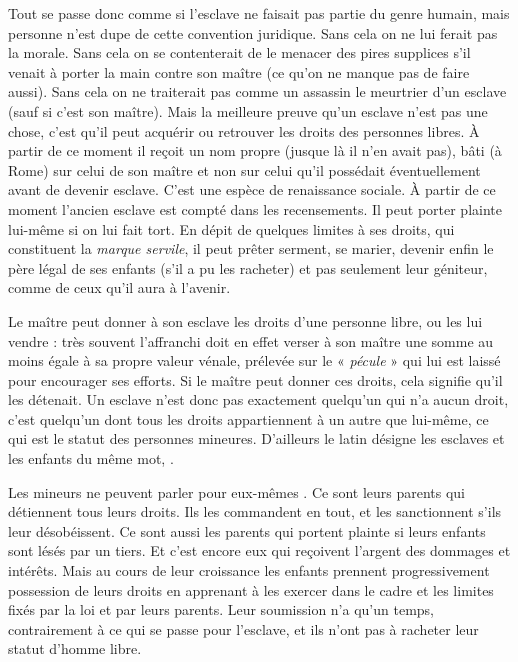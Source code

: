 Tout se passe donc comme si l'esclave ne faisait pas partie du genre
humain, mais personne n'est dupe de cette convention juridique. Sans
cela on ne lui ferait pas la morale. Sans cela on se contenterait de le menacer
des pires supplices s'il venait à porter la main contre son maître (ce
qu'on ne manque pas de faire aussi). Sans cela on ne traiterait pas comme
un assassin le meurtrier d'un esclave (sauf si c'est son maître). Mais la
meilleure preuve qu'un esclave n'est pas une chose, c'est qu'il peut acquérir
ou retrouver les droits des personnes libres. À partir de ce moment il
reçoit un nom propre (jusque là il n'en avait pas), bâti (à Rome) sur celui
de son maître et non sur celui qu'il possédait éventuellement avant de
devenir esclave. C'est une espèce de renaissance sociale. À partir de ce
moment l'ancien esclave est compté dans les recensements. Il peut porter
plainte lui-même si on lui fait tort. En dépit de quelques limites à ses
droits, qui constituent la \emph{marque servile}, il peut prêter serment, se marier,
devenir enfin le père légal de ses enfants (s'il a pu les racheter) et pas seulement
leur géniteur, comme de ceux qu'il aura à l'avenir.

Le maître peut donner à son esclave les droits d'une personne libre,
ou les lui vendre : très souvent l'affranchi doit en effet verser à son
maître une somme au moins égale à sa propre valeur vénale, prélevée sur
le « \emph{pécule} » qui lui est laissé pour encourager ses efforts. Si le maître peut
donner ces droits, cela signifie qu'il les détenait. Un esclave n'est donc
pas exactement quelqu'un qui n'a aucun droit, c'est quelqu'un dont tous
les droits appartiennent à un autre que lui-même, ce qui est le statut des
personnes mineures. D'ailleurs le latin désigne les esclaves et les enfants
du même mot, .

Les mineurs ne peuvent parler pour eux-mêmes . Ce sont
leurs parents qui détiennent tous leurs droits. Ils les commandent en
tout, et les sanctionnent s'ils leur désobéissent. Ce sont aussi les parents
qui portent plainte si leurs enfants sont lésés par un tiers. Et c'est encore
eux qui reçoivent l'argent des dommages et intérêts. Mais au cours de
leur croissance les enfants prennent progressivement possession de leurs
droits en apprenant à les exercer dans le cadre et les limites fixés par la
loi et par leurs parents. Leur soumission n'a qu'un temps, contrairement
à ce qui se passe pour l'esclave, et ils n'ont pas à racheter leur statut
d'homme libre.

